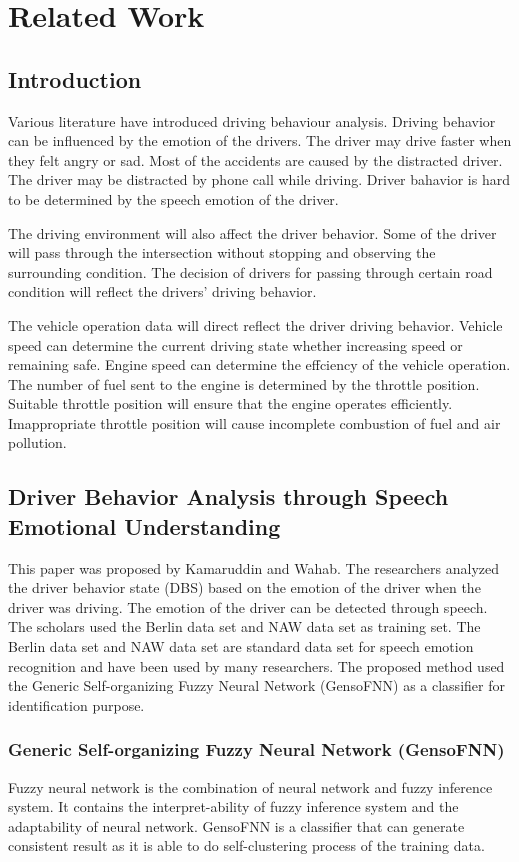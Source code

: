 \chapter{Related Work}
\section{Introduction}
Various literature have introduced driving behaviour analysis. Driving behavior can be influenced by the emotion of the drivers. The driver may drive faster when they felt angry or sad. Most of the accidents are caused by the distracted driver. The driver may be distracted by phone call while driving. Driver bahavior is hard to be determined by the speech emotion of the driver.\cite{kamaruddin:wahab:2010}

The driving environment will also affect the driver behavior. Some of the driver will pass through the intersection without stopping and observing the surrounding condition. The decision of drivers for passing through certain road condition will reflect the drivers' driving behavior.

The vehicle operation data will direct reflect the driver driving behavior. Vehicle speed can determine the current driving state whether increasing speed or remaining safe. Engine speed can determine the effciency of the vehicle operation. The number of fuel sent to the engine is determined by the throttle position. Suitable throttle position will ensure that the engine operates efficiently. Imappropriate throttle position will cause incomplete combustion of fuel and air pollution.\cite{chen:pan:lu:2015}   

\section{Driver Behavior Analysis through Speech Emotional Understanding}
This paper was proposed by Kamaruddin and Wahab\citeyear{kamaruddin:wahab:2010}. The researchers analyzed the driver behavior state (DBS) based on the emotion of the driver when the driver was driving. The emotion of the driver can be detected through speech. 
The scholars used the Berlin data set and NAW data set as training set. The Berlin data set and NAW data set are standard data set for speech emotion recognition and have been used by many researchers.
The proposed method used the Generic Self-organizing Fuzzy Neural Network (GensoFNN) as a classifier for identification purpose. 
\subsection{Generic Self-organizing Fuzzy Neural Network (GensoFNN)}
Fuzzy neural network is the combination of neural network and fuzzy inference system. It contains the interpret-ability of fuzzy inference system and the adaptability of neural network. GensoFNN is a classifier that can generate consistent result as it is able to do self-clustering process of the training data.
